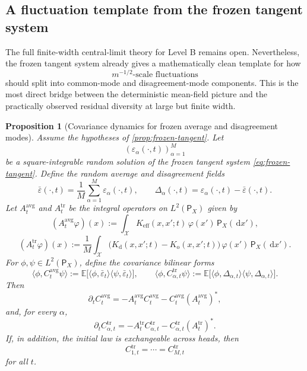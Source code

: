 \documentclass[11pt]{article}
\newtheorem{proposition}[theorem]{Proposition}
\theoremstyle{definition}
\newcommand{\E}{\mathbb{E}}
\newcommand{\dd}{\,\mathrm{d}}
\begin{document}
\subsection{A fluctuation template from the frozen tangent system}

The full finite-width central-limit theory for Level B remains open.
Nevertheless, the frozen tangent system already gives a mathematically clean template for how
\[
  m^{-1/2}\text{-scale fluctuations}
\]
should split into common-mode and disagreement-mode components.
This is the most direct bridge between the deterministic mean-field picture and the practically observed residual diversity at large but finite width.

\begin{proposition}[Covariance dynamics for frozen average and disagreement modes]
\label{prop:frozen-covariance}
Assume the hypotheses of \cref{prop:frozen-tangent}.
Let
\[
  (\varepsilon_\alpha(\cdot,t))_{\alpha=1}^M
\]
be a square-integrable random solution of the frozen tangent system \eqref{eq:frozen-tangent}.
Define the random average and disagreement fields
\[
  \bar \varepsilon(\cdot,t)=\frac1M\sum_{\alpha=1}^M \varepsilon_\alpha(\cdot,t),
  \qquad
  \Delta_\alpha(\cdot,t)=\varepsilon_\alpha(\cdot,t)-\bar\varepsilon(\cdot,t).
\]
Let $A_t^{\mathrm{avg}}$ and $A_t^{\mathrm{tr}}$ be the integral operators on $L^2(\mathsf P_X)$
given by
\[
  (A_t^{\mathrm{avg}}\varphi)(x)
  :=
  \int_{\mathcal X}
  K_{\mathrm{eff}}(x,x';t)\,\varphi(x')\,\mathsf P_X(\dd x'),
\]
\[
  (A_t^{\mathrm{tr}}\varphi)(x)
  :=
  \frac1M\int_{\mathcal X}
  \bigl(K_{\mathrm d}(x,x';t)-K_{\mathrm o}(x,x';t)\bigr)\,
  \varphi(x')\,\mathsf P_X(\dd x').
\]
For $\phi,\psi\in L^2(\mathsf P_X)$, define the covariance bilinear forms
\[
  \langle \phi, C_t^{\mathrm{avg}}\psi\rangle
  :=
  \E\bigl[\langle \phi,\bar\varepsilon_t\rangle \langle \psi,\bar\varepsilon_t\rangle\bigr],
  \qquad
  \langle \phi, C_{\alpha,t}^{\mathrm{tr}}\psi\rangle
  :=
  \E\bigl[\langle \phi,\Delta_{\alpha,t}\rangle \langle \psi,\Delta_{\alpha,t}\rangle\bigr].
\]
Then
\begin{equation}
  \partial_t C_t^{\mathrm{avg}}
  =
  -A_t^{\mathrm{avg}} C_t^{\mathrm{avg}}
  -
  C_t^{\mathrm{avg}} (A_t^{\mathrm{avg}})^*,
  \label{eq:frozen-cov-avg}
\end{equation}
and, for every $\alpha$,
\begin{equation}
  \partial_t C_{\alpha,t}^{\mathrm{tr}}
  =
  -A_t^{\mathrm{tr}} C_{\alpha,t}^{\mathrm{tr}}
  -
  C_{\alpha,t}^{\mathrm{tr}} (A_t^{\mathrm{tr}})^*.
  \label{eq:frozen-cov-tr}
\end{equation}
If, in addition, the initial law is exchangeable across heads, then
\[
  C_{1,t}^{\mathrm{tr}}=\cdots=C_{M,t}^{\mathrm{tr}}
\]
for all $t$.
\end{proposition}
\end{document}
